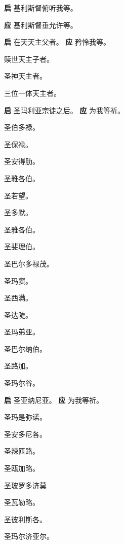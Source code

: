 \documentclass[UTF8,17pt]{ctexart}
\begin{document}
\textbf{启} \quad 基利斯督俯听我等。

\textbf{应} \quad 基利斯督垂允许等。

\textbf{启} \quad 在天天主⽗者。 \hfill \textbf{应} \quad 矜怜我等。

 赎世天主⼦者。

 圣神天主者。

 三位⼀体天主者。

\textbf{启} \quad 圣玛利亚宗徒之后。 \hfill \textbf{应} \quad 为我等祈。

 圣伯多禄。

 圣保禄。

 圣安得肋。

 圣雅各伯。

 圣若望。

 圣多默。

 圣雅各伯。

 圣斐理伯。

 圣巴尔多禄茂。

 圣玛窦。

 圣西满。

 圣达陡。

 圣玛弟亚。

 圣巴尔纳伯。

 圣路加。

 圣玛尔⾕。

\textbf{启} \quad 圣亚纳尼亚。 \hfill \textbf{应} \quad 为我等祈。

 圣玛是弥诺。

 圣安多尼各。

 圣辣匝路。

 圣瓯加略。

 圣玻罗多济莫

 圣⽡勒略。

 圣彼利斯各。

 圣玛尔济亚尔。
\end{document}
